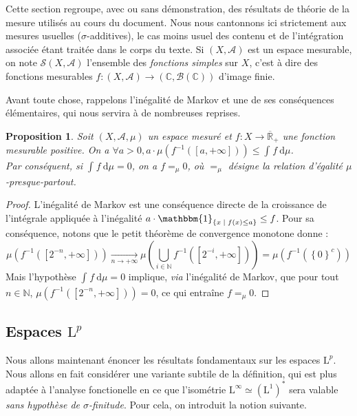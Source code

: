 \documentclass[a4paper,12pt]{article}
\newtheorem{proposition}[theorem]{Proposition}
\newcommand{\R}{\mathbb{R}}
\newcommand{\N}{\mathbb{N}}
\newcommand{\C}{\mathbb{C}}
\newcommand{\Bor}{\mathcal{B}}
\newcommand{\set}[1]{\left\{ #1 \right\}}
\newcommand{\indic}{\mathbbm{1}}
\newcommand{\integral}[4]{\int_{#1}^{#2} #3~\mathrm{d}#4}
\newcommand{\tq}{\;\middle|\;}
\newcommand{\inv}{^{-1}}
\newcommand{\compl}{^c}
\begin{document}
Cette section regroupe, avec ou sans démonstration, des résultats de théorie de la mesure utilisés au cours du document.
Nous nous cantonnons ici strictement aux mesures usuelles ($\sigma$-additives), le cas moins usuel des contenu et de 
l'intégration associée étant traitée dans le corps du texte. 
Si $(X, \mathcal{A})$ est un espace mesurable, on note $\mathscr{S}(X, \mathcal{A})$ l'ensemble des \emph{fonctions simples}
sur $X$, c'est à dire des fonctions mesurables $f : (X, \mathcal{A})\to(\C, \Bor(\C))$ d'image finie. 

Avant toute chose, rappelons l'inégalité de Markov et une de ses conséquences élémentaires, qui nous servira à de nombreuses reprises.
\begin{proposition}\label{markov_and_consequence}
    Soit $(X, \mathcal{A}, \mu)$ un espace mesuré et $f:X\to\overline{\R}_+$ une fonction mesurable positive.
    On a $\forall a>0, a\cdot\mu\left(f\inv([a, +\infty])\right) \le \integral{}{}{f}{\mu}$. \\
    Par conséquent, si $\integral{}{}{f}{\mu} = 0$, on a $f =_\mu 0$, où $=_\mu$ désigne la relation 
    d'égalité $\mu$-presque-partout.
\end{proposition}

\begin{proof}
    L'inégalité de Markov est une conséquence directe de la croissance de l'intégrale appliquée à 
    l'inégalité $a\cdot\indic_{\set{x\tq f(x)\le a}} \le f$. Pour sa conséquence, notons que le petit théorème de convergence monotone donne :
    \begin{equation*}
        \mu(f\inv([2^{-n}, +\infty])) \xrightarrow[n\to+\infty]{} \mu\left(\bigcup_{i\in\N} f\inv([2^{-i}, +\infty])\right) = \mu(f\inv(\set{0}\compl))
    \end{equation*}
    Mais l'hypothèse $\integral{}{}{f}{\mu} = 0$ implique, \emph{via} l'inégalité de Markov, que pour tout $n\in\N$, $\mu(f\inv([2^{-n}, +\infty]))=0$,
    ce qui entraîne $f =_\mu 0$.
\end{proof}

\subsection*{Espaces \texorpdfstring{$\mathrm{L}^p$}{L\textsuperscript{p}}}

Nous allons maintenant énoncer les résultats fondamentaux sur les espaces $\mathrm{L}^p$. Nous allons en fait considérer une variante subtile de 
la définition, qui est plus adaptée à l'analyse fonctionelle en ce que l'isométrie $\mathrm{L}^\infty \simeq (\mathrm{L}^1)^*$
sera valable \emph{sans hypothèse de $\sigma$-finitude}. Pour cela, on introduit la notion suivante.
\end{document}
